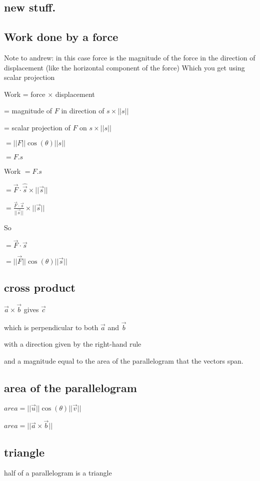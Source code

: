 \documentclass{extarticle}
\begin{document}
\begin{multicols}{4}
\section{new stuff.}

\subsection{Work done by a force}


Note to andrew: in this case force is the magnitude of the force in the direction of displacement (like the horizontal component of the force) Which you get using scalar projection


Work = force $\times$ displacement

= magnitude of $F$ in direction of $s \times ||s||$

= scalar projection of $F$ on $s \times ||s||$

$= ||F||\cos{(\theta)}||s||$

$= F.s$

Work $= F.s$


$=\vec{F} \cdot \hat{\vec{s}} \times ||\vec{s}||$

$=\frac{\vec{F} \cdot \vec{s}}{||\vec{s}||} \times ||\vec{s}||$

So

$=\vec{F} \cdot \vec{s}$

$= ||\vec{F}||\cos(\theta)||\vec{s}||$


\subsection{cross product}
$\vec{a}\times \vec{b}$ gives $\vec{c}$

which is perpendicular to both $\vec{a}$ and $\vec{b}$

with a direction given by the right-hand rule

and a magnitude equal to the area of the parallelogram that the vectors span.

\subsection{area of the parallelogram}
$area =||\vec{u}||\cos{(\theta)}||\vec{v}||$

$area =||\vec{a}\times \vec{b}||$
\subsection{triangle}
half of a parallelogram is a triangle


\end{multicols}
\end{document}
